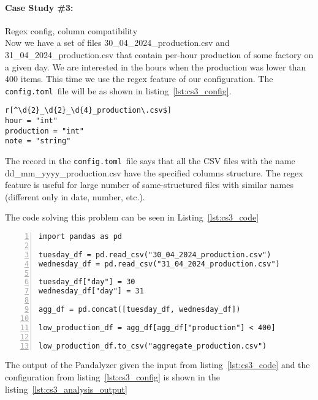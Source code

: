 \paragraph{Case Study \#3:} Regex config, column compatibility \\

Now we have a set of files 30\_04\_2024\_production.csv and 31\_04\_2024\_production.csv that contain per-hour production
of some factory on a given day.
We are interested in the hours when the production was lower than 400 items.
This time we use the regex feature of our configuration.
The \verb|config.toml|~file will be as shown in listing~\ref{lst:cs3_config}.

\begin{lstlisting}[caption=config.toml of the second case study, label={lst:cs3_config}, captionpos=b]
r[^\d{2}_\d{2}_\d{4}_production\.csv$]
hour = "int"
production = "int"
note = "string"
\end{lstlisting}

The record in the \verb|config.toml|~file says that all the CSV files with the name dd\_mm\_yyyy\_production.csv have the
specified columns structure.
The regex feature is useful for large number of same-structured files with similar names (different only in date,
number, etc.).

The code solving this problem can be seen in Listing~\ref{lst:cs3_code}

\begin{lstlisting}[caption=Solution of the third case study in Pandas, label={lst:cs3_code}, captionpos=b, numbers=left]
import pandas as pd

tuesday_df = pd.read_csv("30_04_2024_production.csv")
wednesday_df = pd.read_csv("31_04_2024_production.csv")

tuesday_df["day"] = 30
wednesday_df["day"] = 31

agg_df = pd.concat([tuesday_df, wednesday_df])

low_production_df = agg_df[agg_df["production"] < 400]

low_production_df.to_csv("aggregate_production.csv")
\end{lstlisting}

The output of the Pandalyzer given the input from listing~\ref{lst:cs3_code} and the configuration from
listing~\ref{lst:cs3_config} is shown in the listing~\ref{lst:cs3_analysis_output}

